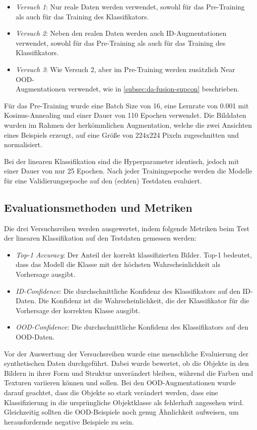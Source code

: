 \begin{itemize} %
	\item \emph{Versuch 1}: Nur reale Daten werden verwendet, sowohl für das Pre-Training als auch für das Training des Klassifikators.
	\item \emph{Versuch 2}: Neben den realen Daten werden auch ID-Augmentationen verwendet, sowohl für das Pre-Training als auch für das Training des Klassifikators.
	\item \emph{Versuch 3}: Wie Versuch 2, aber im Pre-Training werden zusätzlich Near OOD-\\Augmentationen verwendet, wie in \autoref{subsec:da-fusion-supcon} beschrieben.
\end{itemize}

Für das Pre-Training wurde eine Batch Size von 16, eine Lernrate von 0.001 mit Kosinus-Annealing und einer Dauer von 110 Epochen verwendet. Die Bilddaten wurden im Rahmen der herkömmlichen Augmentation, welche die zwei Ansichten eines Beispiels erzeugt, auf eine Größe von 224x224 Pixeln zugeschnitten und normalisiert.

Bei der linearen Klassifikation sind die Hyperparameter identisch, jedoch mit einer Dauer von nur 25 Epochen. Nach jeder Trainingsepoche werden die Modelle für eine Validierungsepoche auf den (echten) Testdaten evaluiert.

\subsection{Evaluationsmethoden und Metriken} \label{subsec:evaluation}

Die drei Versuchsreihen werden ausgewertet, indem folgende Metriken beim Test der linearen Klassifikation auf den Testdaten gemessen werden:

\begin{itemize}
	\item \emph{Top-1 Accuracy}: Der Anteil der korrekt klassifizierten Bilder. Top-1 bedeutet, dass das Modell die Klasse mit der höchsten Wahrscheinlichkeit als Vorhersage ausgibt.
	\item \emph{ID-Confidence}: Die durchschnittliche Konfidenz des Klassifikators auf den ID-Daten. Die Konfidenz ist die Wahrscheinlichkeit, die der Klassifikator für die Vorhersage der korrekten Klasse ausgibt.
	\item \emph{OOD-Confidence}: Die durchschnittliche Konfidenz des Klassifikators auf den OOD-Daten.
\end{itemize}

Vor der Auswertung der Versuchsreihen wurde eine menschliche Evaluierung der synthetischen Daten durchgeführt. Dabei wurde bewertet, ob die Objekte in den Bildern in ihrer Form und Struktur unverändert bleiben, während die Farben und Texturen variieren können und sollen. Bei den OOD-Augmentationen wurde darauf geachtet, dass die Objekte so stark verändert werden, dass eine Klassifizierung in die ursprüngliche Objektklasse als fehlerhaft angesehen wird. Gleichzeitig sollten die OOD-Beispiele noch genug Ähnlichkeit aufweisen, um herausfordernde negative Beispiele zu sein.
